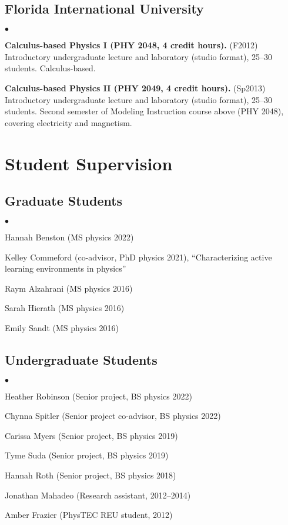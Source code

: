 \documentclass[a4paper,10pt]{article}
\newcommand{\squishlist}{
	\begin{list}{$\bullet$}
		{ \setlength{\itemsep}{0pt}
			\setlength{\parsep}{3pt}
			\setlength{\topsep}{3pt}
			\setlength{\partopsep}{0pt}
			\setlength{\labelwidth}{1em}
			\setlength{\labelsep}{0.5em} } }
\newcommand{\squishend}{
\end{list}  }
\begin{document}
\subsection*{Florida International University}

\squishlist
\item \textbf{Calculus-based Physics I (PHY 2048, 4 credit hours).} 
(F2012) Introductory undergraduate lecture and laboratory (studio format), 25--30 students. Calculus-based. %

\item \textbf{Calculus-based Physics II (PHY 2049, 4 credit hours).} (Sp2013)
Introductory undergraduate lecture and laboratory (studio format), 25--30 students. Second semester of Modeling Instruction course above (PHY 2048), covering electricity and magnetism. 
\squishend


\section*{Student Supervision}

\subsection*{Graduate Students}
\squishlist
\item Hannah Benston (MS physics 2022)
\item Kelley Commeford (co-advisor, PhD physics 2021), ``Characterizing active learning environments in physics''
\item Raym Alzahrani (MS physics 2016)
\item Sarah Hierath (MS physics 2016)
\item Emily Sandt (MS physics 2016)
\squishend

\subsection*{Undergraduate Students}
\squishlist
\item Heather Robinson (Senior project, BS physics 2022)
\item Chynna Spitler (Senior project co-advisor, BS physics 2022)
\item Carissa Myers (Senior project, BS physics 2019)
\item Tyme Suda (Senior project, BS physics 2019)
\item Hannah Roth (Senior project, BS physics 2018)
\item Jonathan Mahadeo (Research assistant, 2012--2014)
\item Amber Frazier (PhysTEC REU student, 2012)
\squishend
\end{document}
